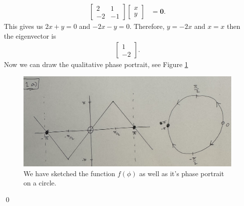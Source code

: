 \documentclass[10pt]{amsart}
\theoremstyle{nonumberplain}
\begin{document}
\begin{enumerate}[label={\bf {\arabic*}:}]
\begin{enumerate}
\begin{align*}
\begin{bmatrix} 2 & 1 \\ -2 & -1 \end{bmatrix}
\begin{bmatrix} x \\ y \end{bmatrix}
	&= \bm { 0 }.
\end{align*}
This gives us $2x + y = 0$ and $-2x -y = 0$.
Therefore, $y = -2x$ and $x = x$ then the eigenvector is
\begin{align*}
\begin{bmatrix} 1 \\ -2 \end{bmatrix}.
\end{align*}
Now we can draw the qualitative phase portrait, see Figure \ref{fig:f4}

\begin{figure}[h]
	\centering
	\includegraphics[height=.4\textwidth]{2_a.png}
 	\caption{We have sketched the function $f(\phi)$ as well as it's phase portrait on a circle.}
	\label{fig:f4}
\end{figure}
\qed \\


\end{enumerate}
\end{enumerate}
\end{document}
